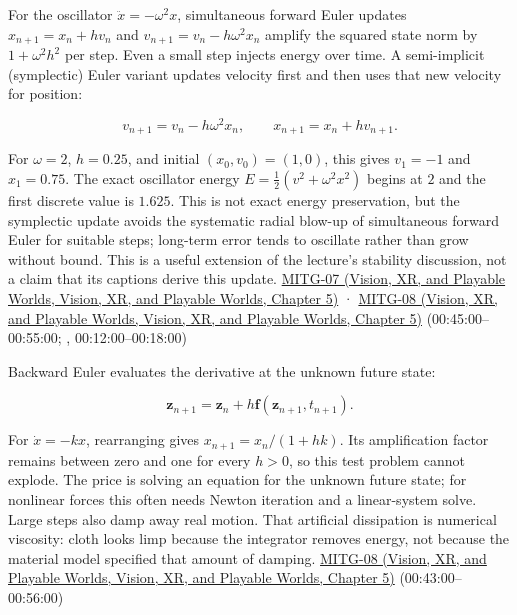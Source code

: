 For the oscillator \(\ddot{x}=-\omega^2x\), simultaneous forward Euler updates \(x_{n+1}=x_n+h v_n\) and \(v_{n+1}=v_n-h\omega^2x_n\) amplify the squared state norm by \(1+\omega^2h^2\) per step. Even a small step injects energy over time. A semi-implicit (symplectic) Euler variant updates velocity first and then uses that new velocity for position:

\[
v_{n+1}=v_n-h\omega^2x_n,\qquad x_{n+1}=x_n+h v_{n+1}.
\]

For \(\omega=2\), \(h=0.25\), and initial \((x_0,v_0)=(1,0)\), this gives \(v_1=-1\) and \(x_1=0.75\). The exact oscillator energy \(E=\frac12(v^2+\omega^2x^2)\) begins at \(2\) and the first discrete value is \(1.625\). This is not exact energy preservation, but the symplectic update avoids the systematic radial blow-up of simultaneous forward Euler for suitable steps; long-term error tends to oscillate rather than grow without bound. This is a useful extension of the lecture's stability discussion, not a claim that its captions derive this update. \href{../07-Vision-XR-and-Playable-Worlds/main.pdf\#nameddest=04-visual-computing-ii-ch036-mitg-07---particle-systems}{MITG-07 (Vision, XR, and Playable Worlds, Vision, XR, and Playable Worlds, Chapter 5)} · \href{../07-Vision-XR-and-Playable-Worlds/main.pdf\#nameddest=04-visual-computing-ii-ch036-mitg-08---cloth-simulation}{MITG-08 (Vision, XR, and Playable Worlds, Vision, XR, and Playable Worlds, Chapter 5)} (00:45:00--00:55:00; , 00:12:00--00:18:00)

Backward Euler evaluates the derivative at the unknown future state:

\[
\boldsymbol{z}_{n+1}=\boldsymbol{z}_n+h\boldsymbol{f}(\boldsymbol{z}_{n+1},t_{n+1}).
\]

For \(\dot{x}=-kx\), rearranging gives \(x_{n+1}=x_n/(1+hk)\). Its amplification factor remains between zero and one for every \(h>0\), so this test problem cannot explode. The price is solving an equation for the unknown future state; for nonlinear forces this often needs Newton iteration and a linear-system solve. Large steps also damp away real motion. That artificial dissipation is numerical viscosity: cloth looks limp because the integrator removes energy, not because the material model specified that amount of damping. \href{../07-Vision-XR-and-Playable-Worlds/main.pdf\#nameddest=04-visual-computing-ii-ch036-mitg-08---cloth-simulation}{MITG-08 (Vision, XR, and Playable Worlds, Vision, XR, and Playable Worlds, Chapter 5)} (00:43:00--00:56:00)

